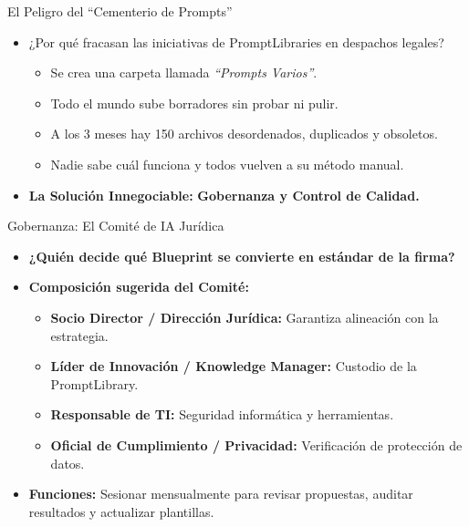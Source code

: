 \documentclass[aspectratio=169]{beamer}
\begin{document}
\begin{frame}{El Peligro del ``Cementerio de Prompts''}

\begin{itemize}
  \item ¿Por qué fracasan las iniciativas de PromptLibraries en despachos legales?
  \begin{itemize}
    \item Se crea una carpeta llamada \textit{``Prompts Varios''}.
    \item Todo el mundo sube borradores sin probar ni pulir.
    \item A los 3 meses hay 150 archivos desordenados, duplicados y obsoletos.
    \item Nadie sabe cuál funciona y todos vuelven a su método manual.
  \end{itemize}
  \item \textbf{La Solución Innegociable:} \textbf{Gobernanza y Control de Calidad.}
\end{itemize}
\end{frame}

\begin{frame}{Gobernanza: El Comité de IA Jurídica}

\begin{itemize}
  \item \textbf{¿Quién decide qué Blueprint se convierte en estándar de la firma?}
  \item \textbf{Composición sugerida del Comité:}
  \begin{itemize}
    \item \textbf{Socio Director / Dirección Jurídica:} Garantiza alineación con la estrategia.
    \item \textbf{Líder de Innovación / Knowledge Manager:} Custodio de la PromptLibrary.
    \item \textbf{Responsable de TI:} Seguridad informática y herramientas.
    \item \textbf{Oficial de Cumplimiento / Privacidad:} Verificación de protección de datos.
  \end{itemize}
  \item \textbf{Funciones:} Sesionar mensualmente para revisar propuestas, auditar resultados y actualizar plantillas.
\end{itemize}
\end{frame}
\end{document}
